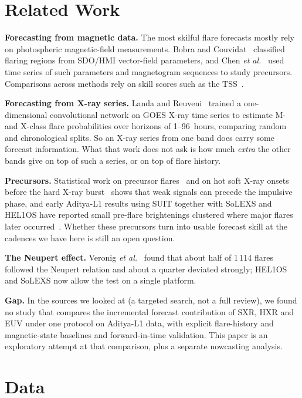 \documentclass[conference]{IEEEtran}
\begin{document}
\section{Related Work}
\textbf{Forecasting from magnetic data.} The most skilful flare forecasts mostly rely on photospheric magnetic-field measurements.  Bobra and Couvidat~\cite{bobra2015} classified flaring regions from SDO/HMI vector-field parameters, and Chen \emph{et al.}~\cite{chen2019} used time series of such parameters and magnetogram sequences to study precursors. Comparisons across methods rely on skill scores such as the TSS~\cite{bloomfield2012,barnes2016}.

\textbf{Forecasting from X-ray series.} Landa and Reuveni~\cite{landa2022} trained a one-dimensional convolutional network on GOES X-ray time series to estimate M- and X-class flare probabilities over horizons of 1--96~hours, comparing random and chronological splits. So an X-ray series from one band does carry some forecast information. What that work does not ask is how much \emph{extra} the other bands give on top of such a series, or on top of flare history.

\textbf{Precursors.} Statistical work on precursor flares~\cite{gyenge2016} and on hot soft X-ray onsets before the hard X-ray burst~\cite{hudson2021} shows that weak signals can precede the impulsive phase, and early Aditya-L1 results using SUIT together with SoLEXS and HEL1OS have reported small pre-flare brightenings clustered where major flares later occurred~\cite{isro2026}. Whether these precursors turn into usable forecast skill at the cadences we have here is still an open question.

\textbf{The Neupert effect.} Veronig \emph{et al.}~\cite{veronig2002} found that about half of 1\,114 flares followed the Neupert relation and about a quarter deviated strongly; HEL1OS and SoLEXS now allow the test on a single platform.

\textbf{Gap.} In the sources we looked at (a targeted search, not a full review), we found no study that compares the incremental forecast contribution of SXR, HXR and EUV under one protocol on Aditya-L1 data, with explicit flare-history and magnetic-state baselines and forward-in-time validation. This paper is an exploratory attempt at that comparison, plus a separate nowcasting analysis.

\section{Data}
\begin{table}[t]
\caption{Data used}
\label{tab:data}
\centering\footnotesize
\resizebox{\columnwidth}{!}{}
\end{table}
\end{document}

